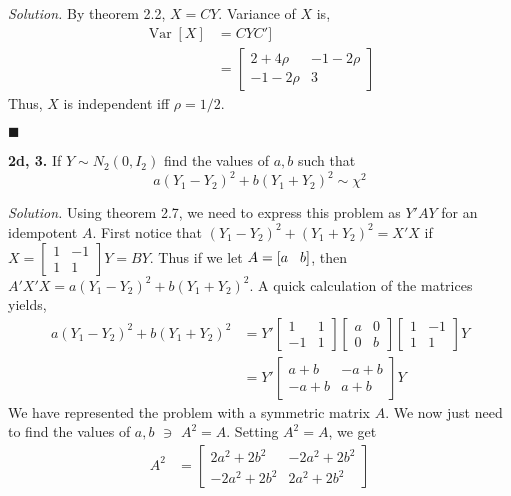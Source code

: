 \documentclass{article}
\newcommand{\Var}{\operatorname{Var}} %
\begin{document}
\vspace{4mm} 
\textit{Solution. } By theorem 2.2, \(X=CY\). Variance of \(X\) is, 
\begin{align*}
\Var[X] &= CYC']\\
&= \begin{bmatrix}
2+4\rho & -1-2\rho\\
-1-2\rho & 3 
\end{bmatrix}
\end{align*}
Thus, \(X \) is independent iff \(\rho = 1/2\). 

\begin{flushright}
\(\blacksquare\)
\end{flushright} 

\newpage
\textbf{2d, 3.} 
If \(Y \sim N_2(0, I_2)\) find the values of \(a,b\) such that \[
a(Y_1-Y_2)^2 + b(Y_1+Y_2)^2 \sim \chi^2
\]


\vspace{4mm} 
\textit{Solution. } Using theorem 2.7, we need to express this problem as \( Y'AY \) for an idempotent \(A\). First notice that \((Y_1-Y_2)^2 + (Y_1+Y_2)^2  = X'X \) if \(X=\begin{bmatrix} 1&-1\\1&1\end{bmatrix}Y = BY \). Thus if we let \(A=[a \hspace{3mm} b]\), then \(A'X'X= a(Y_1-Y_2)^2 + b(Y_1+Y_2)^2\).  A quick calculation of the matrices yields, 
\begin{align*} 
a(Y_1-Y_2)^2 + b(Y_1+Y_2)^2 &= Y'\begin{bmatrix} 1&1\\-1&1\end{bmatrix}\begin{bmatrix} a&0\\0&b\end{bmatrix}\begin{bmatrix}1 &-1\\1&1\end{bmatrix}Y\\
&= Y' \begin{bmatrix} a+b&-a+b\\-a+b&a+b\end{bmatrix} Y
\end{align*} 
We have represented the problem with a symmetric matrix \(A\). We now just need to find the values of \(a,b\) \(\ni\) \(A^2=A\). Setting \(A^2=A\), we get
\begin{align*}
A^2 &= 
\begin{bmatrix}
2a^2+2b^2 & -2a^2 + 2b^2 \\
 -2a^2 + 2b^2&2a^2+2b^2 
\end{bmatrix}
\end{align*}
\end{document}
